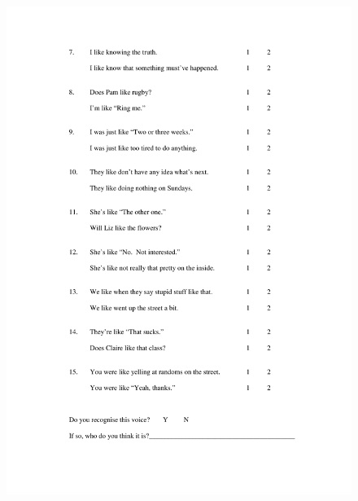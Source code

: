 \begin{figure}
	\centering
		\includegraphics[width=5in]{images/Exp2page2.pdf}
			\label{x2p2}
\end{figure}

